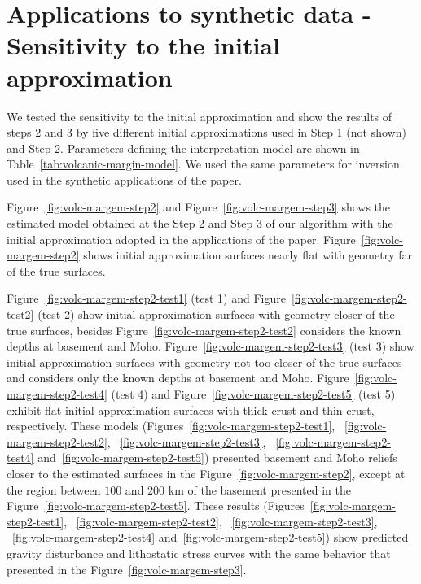 \documentclass[manuscript]{geophysics}
\begin{document}
\section{Applications to synthetic data - Sensitivity to the initial approximation}

We tested the sensitivity to the initial approximation and show the results of steps 2 and 3 by five different initial approximations used in Step 1 (not shown) and Step 2. Parameters defining the interpretation model are shown in Table~\ref{tab:volcanic-margin-model}.  We used the same parameters for inversion used in the synthetic applications of the paper.

Figure~\ref{fig:volc-margem-step2} and Figure~\ref{fig:volc-margem-step3} shows the estimated model obtained at the Step 2 and Step 3 of our algorithm with the initial approximation adopted in the applications of the paper. Figure~\ref{fig:volc-margem-step2} shows initial approximation surfaces nearly flat with geometry far of the true surfaces. 

Figure~\ref{fig:volc-margem-step2-test1} (test 1) and Figure~\ref{fig:volc-margem-step2-test2} (test 2) show initial approximation surfaces with geometry closer of the true surfaces, besides Figure~\ref{fig:volc-margem-step2-test2} considers the known depths at basement and Moho. Figure~\ref{fig:volc-margem-step2-test3} (test 3) show initial approximation surfaces with geometry not too closer of the true surfaces and considers only the known depths at basement and Moho. Figure~\ref{fig:volc-margem-step2-test4} (test 4) and Figure~\ref{fig:volc-margem-step2-test5} (test 5) exhibit flat initial approximation surfaces with thick crust and thin crust, respectively. These models (Figures~\ref{fig:volc-margem-step2-test1}, ~\ref{fig:volc-margem-step2-test2}, ~\ref{fig:volc-margem-step2-test3}, ~\ref{fig:volc-margem-step2-test4} and~\ref{fig:volc-margem-step2-test5}) presented basement and Moho reliefs closer to the estimated surfaces in the Figure~\ref{fig:volc-margem-step2}, except at the region between $100$ and $200$ km of the basement presented in the Figure~\ref{fig:volc-margem-step2-test5}. These results (Figures~\ref{fig:volc-margem-step2-test1}, ~\ref{fig:volc-margem-step2-test2}, ~\ref{fig:volc-margem-step2-test3}, ~\ref{fig:volc-margem-step2-test4} and~\ref{fig:volc-margem-step2-test5}) show predicted gravity disturbance and lithostatic stress curves with the same behavior that presented in the Figure~\ref{fig:volc-margem-step3}. 
\end{document}
